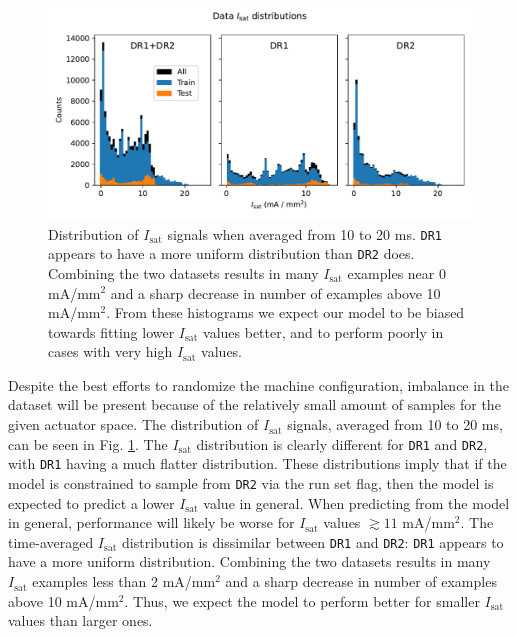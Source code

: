 \begin{figure}
	\centering
	\includegraphics[width=\linewidth]{figures/PP1_02_isat_distribution.pdf}
	\caption[Time-averaged $I_\text{sat}$ distribution over shots]{\label{fig:PP1_02_isat_distribution}Distribution of $I_\text{sat}$ signals when averaged from 10 to 20 ms. \texttt{DR1} appears to have a more uniform distribution than \texttt{DR2} does. Combining the two datasets results in many $I_\text{sat}$ examples near 0 mA/mm$^2$ and a sharp decrease in number of examples above 10 mA/mm$^2$. From these histograms we expect our model to be biased towards fitting lower $I_\text{sat}$ values better, and to perform poorly in cases with very high $I_\text{sat}$ values.}
\end{figure}

Despite the best efforts to randomize the machine configuration, imbalance in the dataset will be present because of the relatively small amount of samples for the given actuator space. The distribution of $I_\text{sat}$ signals, averaged from 10 to 20 ms, can be seen in Fig. \ref{fig:PP1_02_isat_distribution}. The $I_\text{sat}$ distribution is clearly different for \texttt{DR1} and \texttt{DR2}, with \texttt{DR1} having a much flatter distribution. These distributions imply that if the model is constrained to sample from \texttt{DR2} via the run set flag, then the model is expected to predict a lower $I_\text{sat}$ value in general. When predicting from the model in general, performance will likely be worse for $I_\text{sat}$ values $\gtrsim 11$ mA/mm$^2$. The time-averaged $I_\text{sat}$ distribution is dissimilar between \texttt{DR1} and \texttt{DR2}: \texttt{DR1} appears to have a more uniform distribution. Combining the two datasets results in many $I_\text{sat}$ examples less than 2 mA/mm$^2$ and a sharp decrease in number of examples above 10 mA/mm$^2$. Thus, we expect the model to perform better for smaller $I_\text{sat}$ values than larger ones. 


